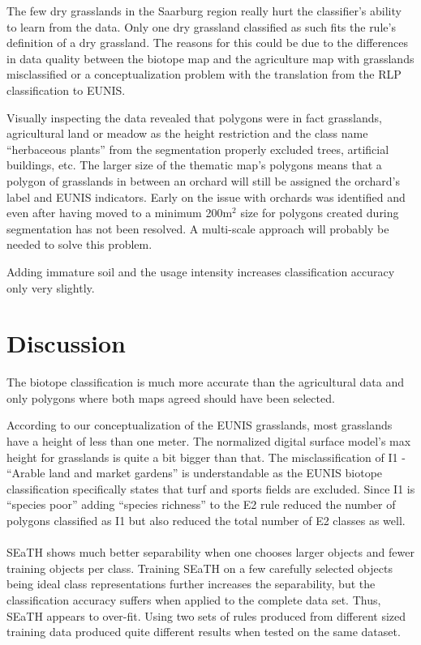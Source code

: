 \documentclass[authoryear, review,12pt,number]{elsarticle}
\begin{document}
{The few dry grasslands in the Saarburg region really hurt the classifier's 
ability to learn from the data. Only one dry grassland classified as such fits 
the rule's definition of a dry grassland. The reasons for this could be due to 
the differences in data quality between the biotope map and the agriculture map 
with grasslands misclassified or a conceptualization problem with the 
translation from the RLP classification to EUNIS. 

Visually inspecting the data revealed that polygons were in fact grasslands, 
agricultural land or meadow as the height restriction and the class name 
``herbaceous plants'' from the segmentation properly excluded trees, artificial 
buildings, etc. The larger size of the thematic map's 
polygons means that a polygon of grasslands in between an orchard will still be 
assigned the orchard's label and EUNIS indicators. Early on the issue with
orchards was identified and even after having moved to a minimum 200m$^{2}$ size for
polygons created during segmentation has not been resolved. A multi-scale
approach will probably be needed to solve this problem.

Adding immature soil and the usage intensity increases classification accuracy 
only very slightly.

\section{Discussion}


The biotope classification is much more 
accurate than the agricultural data and only polygons where both maps agreed 
should have been selected.

According to our conceptualization of the EUNIS grasslands, most grasslands 
have a height of less than one meter. The normalized digital surface model's 
max height for grasslands is quite a bit bigger than that.
The misclassification of I1 - ``Arable land and market gardens'' is 
understandable as the EUNIS biotope classification specifically states that 
turf and sports fields are excluded. Since I1 is ``species poor'' adding 
``species richness'' to the E2 rule reduced the number of polygons classified 
as I1 but also reduced the total number of E2 classes as well.\\
\\
SEaTH shows much better separability when one chooses
larger objects and fewer training objects per class. Training SEaTH on a few
carefully selected objects being ideal class representations further increases
the separability, but the classification accuracy suffers when applied to the
complete data set. Thus, SEaTH appears to over-fit. Using two sets of rules 
produced from different sized training data produced quite different results 
when tested on the same dataset. 
\\
}
\end{document}
